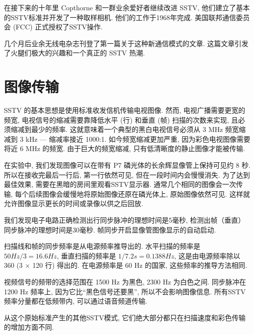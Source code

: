 在接下来的十年里 Copthorne 和一群业余爱好者继续改进 SSTV, 他们建立了基本的SSTV标准并开发了一种取样相机. 他们的工作于1968年完成. 美国联邦通信委员会 (FCC) 正式授权了SSTV操作. 

几个月后业余无线电杂志刊登了第一篇关于这种新通信模式的文章. 这篇文章引发了火腿们极大的兴趣和一个真正的 SSTV 热潮. 

\section{图像传输}

SSTV 的基本思想是使用标准收发信机传输电视图像. 然而, 电视广播需要更宽的频宽, 电视信号的缩减需要靠降低水平 (行) 和垂直 (帧) 扫描的次数来实现, 且必须缩减到最少的频率. 这就意味着一个典型的黑白电视信号必须从 3 MHz 频宽缩减到 3 kHz --- 缩减率接近 1000:1. 如今频宽缩减更加严重, 因为彩色电视图像需要将近 6 MHz 的频宽. 由于巨大的频宽缩减, 只有低清晰度的静止图像才能被传输. 

在实验中, 我们发现图像可以在带有 P7 磷光体的长余辉显像管上保持可见约 8 秒. 所以在接收完最后一行后, 第一行依然可见, 但在一段时间内会慢慢消失. 为了达到最佳效果, 需要在黑暗的房间里观看SSTV显示器. 通常几个相同的图像会一次传输, 每个后续图像会缓慢地将原始图像还原在磷光体上, 原始图像依然可见. 这样就允许图像显示更长的时间或录像以供之后回放. 

我们发现电子电路正确检测出行同步脉冲的理想时间是5毫秒, 检测出帧（垂直）同步脉冲的理想时间是30毫秒. 帧同步开启显像管图像显示的自动启动. 

扫描线和帧的同步频率是从电源频率推导出的. 水平扫描的频率是 $50 Hz / 3 = 16.6 Hz$, 垂直扫描的频率是 $1/7.2 s=0.1388 Hz$, 这是由电源频率除以 360 (3 $\times$ 120 行) 得出的. 在电源频率是 60 Hz 的国家, 这些频率的推导方法相同. 

视频信号的频带的选择范围在 1500 Hz 为黑色, 2300 Hz 为白色之间. 同步脉冲在 1200 Hz 频率上, 因为它比“黑色信号还要黑”, 所以不会影响图像信息. 所有SSTV频率分量都在低频带内, 可以通过语音频道传输. 

从这个原始标准产生的其他SSTV模式, 它们绝大部分都只在扫描速度和彩色传输的增加方面不同. 
